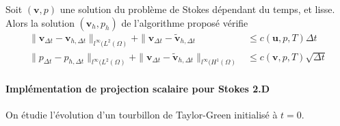 \begin{theoreme}
    Soit $(\mathbf{v}, p)$ une solution du problème de Stokes dépendant du temps, et lisse. Alors la solution $(\mathbf{v}_h, p_h)$ de l'algorithme proposé vérifie
    \begin{align*}
        \| \mathbf{v}_{\Delta t} - \mathbf{v}_{h, \Delta t} \|_{l^{\infty}(L^2(\Omega)} + \| \mathbf{v}_{\Delta t} - \tilde{\mathbf{v}}_{h, \Delta t} & \leqslant c(\mathbf{u}, p, T) \Delta t \\
        \| p_{\Delta t} - p_{h, \Delta t} \|_{l^{\infty}(L^2(\Omega)} + \| \mathbf{v}_{\Delta t} - \tilde{\mathbf{v}}_{h, \Delta t} \|_{l^{\infty}(H^1(\Omega)} & \leqslant c(\mathbf{v}, p, T) \sqrt{\Delta t}
    \end{align*}
\end{theoreme}

\paragraph{Implémentation de projection scalaire pour Stokes 2.D} On étudie l'évolution d'un tourbillon de Taylor-Green initialisé à $t=0$.

